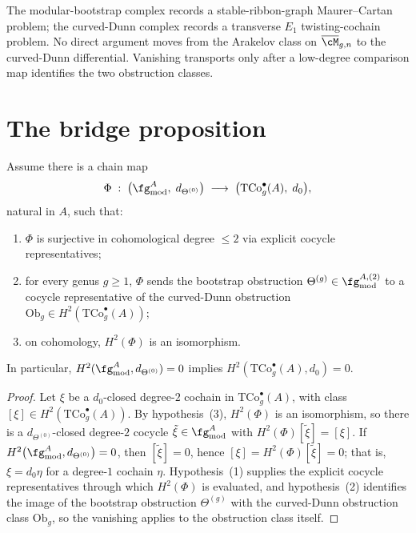 \begin{remark}
\label{rem:two-complex-fm67}
The modular-bootstrap complex records a stable-ribbon-graph
Maurer--Cartan problem; the curved-Dunn complex records a transverse
\(E_{1}\) twisting-cochain problem. No direct argument moves from
the Arakelov class on \(\overline{\cM}_{g,n}\) to the curved-Dunn
differential. Vanishing transports only after a low-degree
comparison map identifies the two obstruction classes.
\end{remark}

\section{The bridge proposition}
\label{sec:bridge}

\begin{proposition}
\label{prop:modular-bootstrap-to-curved-dunn-bridge}
Assume there is a chain map
\[
 \Phi\;:\;
 \bigl(\fg^{A}_{\mathrm{mod}},\; d_{\Theta^{(0)}}\bigr)
 \;\longrightarrow\;
 \bigl(\mathrm{TCo}^{\bullet}_{g}(A),\; d_{0}\bigr),
\]
natural in \(A\), such that:
\begin{enumerate}
 \item \(\Phi\) is surjective in cohomological degree \(\le 2\) via
 explicit cocycle representatives;
 \item for every genus \(g \ge 1\), \(\Phi\) sends the bootstrap
 obstruction \(\Theta^{(g)} \in \fg^{A,(2)}_{\mathrm{mod}}\) to a
 cocycle representative of the curved-Dunn obstruction
 \(\mathrm{Ob}_{g} \in H^{2}(\mathrm{TCo}^{\bullet}_{g}(A))\);
 \item on cohomology, \(H^{2}(\Phi)\) is an isomorphism.
\end{enumerate}
In particular, \(H^{2}(\fg^{A}_{\mathrm{mod}}, d_{\Theta^{(0)}}) = 0\)
implies \(H^{2}(\mathrm{TCo}^{\bullet}_{g}(A), d_{0}) = 0\).
\end{proposition}

\begin{proof}
Let \(\xi\) be a \(d_{0}\)-closed degree-\(2\) cochain in
\(\mathrm{TCo}^{\bullet}_{g}(A)\), with class
\([\xi] \in H^{2}(\mathrm{TCo}^{\bullet}_{g}(A))\). By
hypothesis~(3), \(H^{2}(\Phi)\) is an isomorphism, so there is a
\(d_{\Theta^{(0)}}\)-closed degree-\(2\) cocycle
\(\tilde{\xi} \in \fg^{A}_{\mathrm{mod}}\) with
\(H^{2}(\Phi)[\tilde{\xi}] = [\xi]\). If
\(H^{2}\bigl(\fg^{A}_{\mathrm{mod}}, d_{\Theta^{(0)}}\bigr) = 0\),
then \([\tilde{\xi}] = 0\), hence
\([\xi] = H^{2}(\Phi)[\tilde{\xi}] = 0\); that is,
\(\xi = d_{0}\eta\) for a degree-\(1\) cochain \(\eta\).
Hypothesis~(1) supplies the explicit cocycle representatives
through which \(H^{2}(\Phi)\) is evaluated, and hypothesis~(2)
identifies the image of the bootstrap obstruction
\(\Theta^{(g)}\) with the curved-Dunn obstruction class
\(\mathrm{Ob}_{g}\), so the vanishing applies to the obstruction
class itself.
\end{proof}

